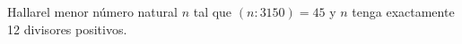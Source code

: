 \begin{enunciado}{\ejercicio}
        Hallarel menor número natural $n$ tal que $(n : 3150) = 45$ y $n$ tenga exactamente 12 divisores positivos.
\end{enunciado}
